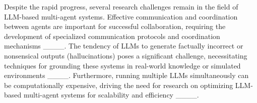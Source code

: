 Despite the rapid progress, several research challenges remain in the field of LLM-based multi-agent systems. Effective communication and coordination between agents are important for successful collaboration, requiring the development of specialized communication protocols and coordination mechanisms ____. The tendency of LLMs to generate factually incorrect or nonsensical outputs (hallucinations) poses a significant challenge, necessitating techniques for grounding these systems in real-world knowledge or simulated environments ____. Furthermore, running multiple LLMs simultaneously can be computationally expensive, driving the need for research on optimizing LLM-based multi-agent systems for scalability and efficiency ____.